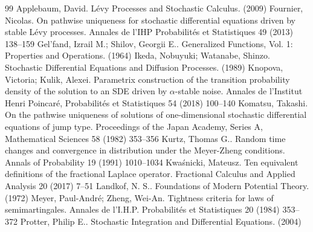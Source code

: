 \documentclass[10pt,a4paper]{amsart}
\newcommand{\1}{\mathbf{1}}
\begin{document}
\begin{thebibliography}{99}
 Applebaum, David. L{\'e}vy Processes and Stochastic Calculus. (2009)
 Fournier, Nicolas. On pathwise uniqueness for stochastic differential equations driven by stable {L{\'e}vy} processes. Annales de l'IHP Probabilit{\'e}s et Statistiques 49 (2013) 138--159
 Gel'fand, Izrail M.; Shilov, Georgii E.. Generalized Functions, Vol. 1: Properties and Operations. (1964)
 Ikeda, Nobuyuki; Watanabe, Shinzo. Stochastic Differential Equations and Diffusion Processes. (1989)
 Knopova, Victoria; Kulik, Alexei. Parametrix construction of the transition probability density of the solution to an {SDE} driven by {$\alpha$}-stable noise. Annales de l'Institut Henri Poincar{\'e}, Probabilit{\'e}s et Statistiques 54 (2018) 100--140
 Komatsu, Takashi. On the pathwise uniqueness of solutions of one-dimensional stochastic differential equations of jump type. Proceedings of the Japan Academy, Series A, Mathematical Sciences 58 (1982) 353--356
 Kurtz, Thomas G.. Random time changes and convergence in distribution under the Meyer-Zheng conditions. Annals of Probability 19 (1991) 1010--1034
 Kwa\'snicki, Mateusz. Ten equivalent definitions of the fractional {L}aplace operator. Fractional Calculus and Applied Analysis 20 (2017) 7--51
 Landkof, N. S.. Foundations of Modern Potential Theory. (1972)
 Meyer, Paul-Andr\'e; Zheng, Wei-An. Tightness criteria for laws of semimartingales. Annales de l'I.H.P. Probabilit{\'e}s et Statistiques 20 (1984) 353--372
 Protter, Philip E.. Stochastic Integration and Differential Equations. (2004)
\end{thebibliography}
\end{document}
